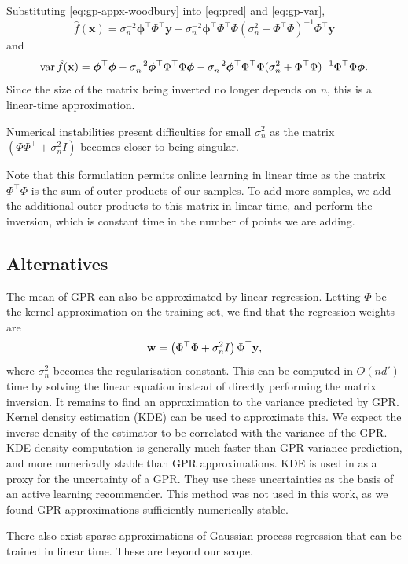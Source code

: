 \documentclass[11pt,twoside,openright]{report}
\newcommand\bphi{\bm{\phi}}
\newcommand\bw{\mathbf{w}}
\newcommand\bx{\mathbf{x}}
\newcommand\by{\mathbf{y}}
\DeclareMathOperator{\var}{var}
\begin{document}
Substituting \cref{eq:gp-appx-woodbury} into \cref{eq:pred} and \cref{eq:gp-var}, \[
    \hat f(\bx) = \sigma_n^{-2} \bphi^\top\Phi^\top\by - \sigma_n^{-2} \bphi^\top\Phi^\top\Phi(\sigma_n^{2} + \Phi^\top\Phi)^{-1}\Phi^\top\by
\] and \[
    \var \hat f(\bx) = \bphi^\top\bphi - \sigma_n^{-2} \bphi^\top\Phi^\top\Phi\bphi - \sigma_n^{-2} \bphi^\top\Phi^\top\Phi(\sigma_n^{2} + \Phi^\top\Phi)^{-1}\Phi^\top\Phi\bphi\text.
\]Since the size of the matrix being inverted no longer depends on $n$, this is a linear-time approximation.

Numerical instabilities present difficulties for small $\sigma_n^2$ as the matrix $(\Phi\Phi^\top + \sigma_n^2I)$ becomes closer to being singular.

Note that this formulation permits online learning in linear time as the matrix $\Phi^\top\Phi$ is the sum of outer products of our samples. To add more samples, we add the additional outer products to this matrix in linear time, and perform the inversion, which is constant time in the number of points we are adding.

\subsection{Alternatives}

The mean of GPR can also be approximated by linear regression. Letting $\Phi$ be the kernel approximation on the training set, we find that the regression weights are\[
    \bw = \left(\Phi^\top\Phi + \sigma_n^2 I\right) \Phi^\top\by\text,
\] where $\sigma_n^2$ becomes the regularisation constant. This can be computed in $O(nd')$ time by solving the linear equation instead of directly performing the matrix inversion. It remains to find an approximation to the variance predicted by GPR. Kernel density estimation (KDE) can be used to approximate this. We expect the inverse density of the estimator to be correlated with the variance of the GPR. KDE density computation is generally much faster than GPR variance prediction, and more numerically stable than GPR approximations. KDE is used in \citep{GPActiveLearning} as a proxy for the uncertainty of a GPR. They use these uncertainties as the basis of an active learning recommender. This method was not used in this work, as we found GPR approximations sufficiently numerically stable.

There also exist sparse approximations of Gaussian process regression that can be trained in linear time. \citep{SparseGPs} \citep{InducingVariables} These are beyond our scope.
\end{document}
